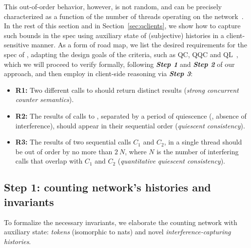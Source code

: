 \noindent

This out-of-order behavior, however, is not random, and can be
precisely characterized as a function of the number of threads
operating on the
network~\cite{Afek-al:OPODIS10,Jagadeesan-Riely:ICALP14}. In the rest
of this section and in Section~\ref{sec:qclients}, we show how to
capture such bounds in the spec using auxiliary state of (subjective)
histories in a client-sensitive manner. As a form of road map, we list
the desired requirements for the spec of ,
%
adapting the design goals of the criteria, such as QC, QQC and
QL~\cite{Aspnes-al:JACM94,Afek-al:OPODIS10,Jagadeesan-Riely:ICALP14},
which we will proceed to verify formally, following \textbf{\emph{Step
    1}} and \textbf{\emph{Step 2}} of our approach, and then employ in
client-side reasoning via \textbf{\emph{Step 3}}:
%
\vspace{2pt}
\begin{itemize}

\item \textbf{R1:} Two different calls to 
  should return distinct results (\emph{strong concurrent
    counter semantics}).

\item \textbf{R2:} The results of calls to ,
  separated by a period of quiescence (\ie, absence of interference),
  should appear in their sequential order (\emph{quiescent
    consistency}).

\item \textbf{R3:} The results of two sequential calls $C_1$ and
  $C_2$, in a single thread should be out of order by no more than $2\
  N$, where $N$ is the number of interfering calls that overlap with
  $C_1$ and $C_2$ (\emph{quantitative quiescent consistency}).

\end{itemize}


\subsection{Step 1: counting network's histories and invariants}
\label{sec:counting-intuition}

To formalize the necessary invariants, we elaborate the counting
network with auxiliary state: \emph{tokens} (isomorphic to nats) and
novel \emph{interference-capturing histories}.

